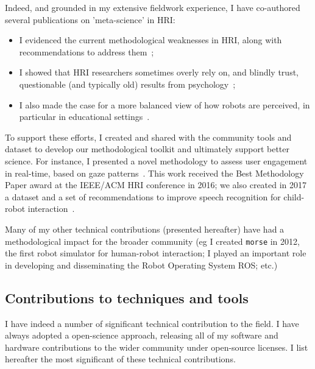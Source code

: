 Indeed, and grounded in my extensive fieldwork experience, I have co-authored
several publications on 'meta-science' in HRI:

\begin{itemize}
    \item I evidenced the current methodological weaknesses in HRI, along with
        recommendations to address them~\autocite{baxter2016characterising};

    \item I showed that HRI researchers sometimes overly rely on, and blindly
        trust, questionable (and typically old) results from
        psychology~\autocite{irfan2018social};

    \item I also made the case for a more balanced view of how robots are
        perceived, in particular in educational
        settings~\autocite{kennedy2016cautious}.

\end{itemize}

To support these efforts, I created and shared with the community tools and dataset to develop our
methodological toolkit and ultimately support better science. For instance, I
presented a novel methodology to assess user engagement in real-time, based on
gaze patterns~\autocite{lemaignan2016realtime}. This work received the
Best Methodology Paper award at the IEEE/ACM HRI conference in 2016; we also
created in 2017 a dataset and a set of recommendations to improve speech
recognition for child-robot interaction~\autocite{kennedy2017child}.

Many of my other technical contributions (presented hereafter) have had a
methodological impact for the broader community (eg I created \texttt{morse} in
2012, the first robot simulator for human-robot interaction; I played an
important role in developing and disseminating the Robot Operating System ROS;
etc.)

\subsection{Contributions to techniques and tools}

I have indeed a number of significant technical contribution to the
field. I have always adopted a open-science approach, releasing all of my
software and hardware contributions to the wider community under open-source
licenses.  I list hereafter the most significant of these technical
contributions.

